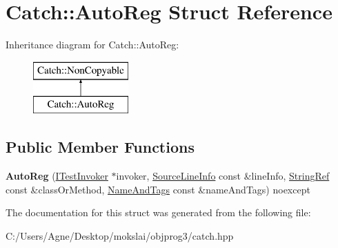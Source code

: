 \hypertarget{struct_catch_1_1_auto_reg}{}\section{Catch\+:\+:Auto\+Reg Struct Reference}
\label{struct_catch_1_1_auto_reg}
Inheritance diagram for Catch\+:\+:Auto\+Reg\+:\begin{figure}[H]
\begin{center}
\leavevmode
\includegraphics[height=2.000000cm]{struct_catch_1_1_auto_reg}
\end{center}
\end{figure}
\subsection*{Public Member Functions}
\begin{DoxyCompactItemize}
\item 
\mbox{\label{struct_catch_1_1_auto_reg_a7eba02fb9d80b9896bf5a6517369af28}} 
{\bfseries Auto\+Reg} (\mbox{\hyperlink{struct_catch_1_1_i_test_invoker}{I\+Test\+Invoker}} $\ast$invoker, \mbox{\hyperlink{struct_catch_1_1_source_line_info}{Source\+Line\+Info}} const \&line\+Info, \mbox{\hyperlink{class_catch_1_1_string_ref}{String\+Ref}} const \&class\+Or\+Method, \mbox{\hyperlink{struct_catch_1_1_name_and_tags}{Name\+And\+Tags}} const \&name\+And\+Tags) noexcept
\end{DoxyCompactItemize}


The documentation for this struct was generated from the following file\+:\begin{DoxyCompactItemize}
\item 
C\+:/\+Users/\+Agne/\+Desktop/mokslai/objprog3/catch.\+hpp\end{DoxyCompactItemize}
